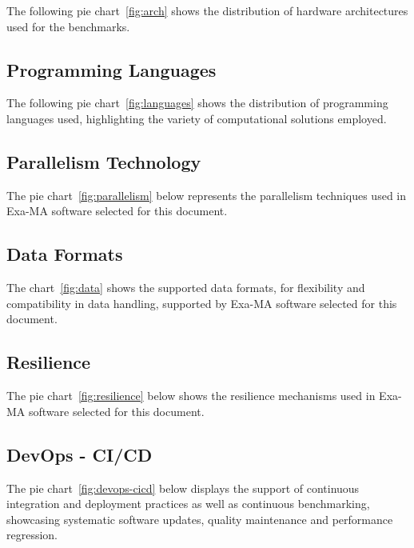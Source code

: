 The following pie chart~\ref{fig:arch} shows the distribution of hardware architectures used for the benchmarks.


\subsection{Programming Languages}

The following pie chart~\ref{fig:languages} shows the distribution of programming languages used, highlighting the variety of computational solutions employed.


\subsection{Parallelism Technology}


The pie chart~\ref{fig:parallelism} below represents the parallelism techniques used in Exa-MA software selected for this document.



\subsection{Data Formats}

The chart~\ref{fig:data} shows the supported data formats, for flexibility and compatibility in data handling, supported by Exa-MA software selected for this document.


\subsection{Resilience}

The pie chart~\ref{fig:resilience} below shows the resilience mechanisms used in Exa-MA software selected for this document.



\subsection{DevOps - CI/CD}

The pie chart~\ref{fig:devops-cicd} below displays the support of continuous integration and deployment practices as well as continuous benchmarking, showcasing systematic software updates, quality maintenance and performance regression.


